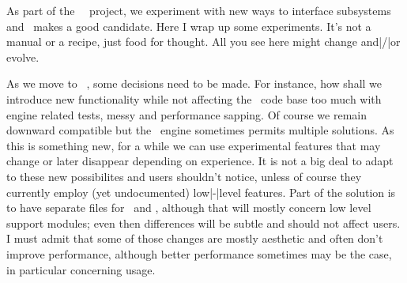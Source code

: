 %


\usemodule[scite]

\startbuffer[abstract]
    As part of the \CONTEXT\ \LMTX\ project, we experiment with new ways to
    interface subsystems and \METAPOST\ makes a good candidate. Here I wrap up some
    experiments. It's not a manual or a recipe, just food for thought. All you see
    here might change and|/|or evolve.
\stopbuffer

\setuplayout
  [backspace=20mm,
   topspace=10mm]

\startdocument
  [title={New interfacing in \METAFUN, a preview},
   author={Hans Hagen & Alan Braslau},
   date=July 2019,
   number=1104 LMTX]

As we move to \CONTEXT\ \LMTX, some decisions need to be made. For instance, how
shall we introduce new functionality while not affecting the \MKIV\ code base too
much with engine related tests, messy and performance sapping. Of course we
remain downward compatible but the \LUAMETATEX\ engine sometimes permits multiple
solutions. As this is something new, for a while we can use experimental features
that may change or later disappear depending on experience. It is not a big deal
to adapt to these new possibilites and users shouldn't notice, unless of course
they currently employ (yet undocumented) low|-|level features. Part of the
solution is to have separate files for \MKIV\ and \LMTX, although that will
mostly concern low level support modules; even then differences will be subtle
and should not affect users. I must admit that some of those changes are mostly
aesthetic and often don't improve performance, although better performance
sometimes may be the case, in particular concerning  usage.


